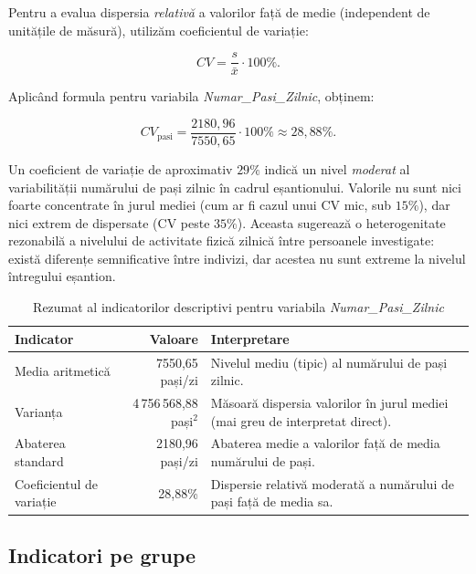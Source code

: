 \documentclass[12pt,a4paper]{report}
\begin{document}
Pentru a evalua dispersia \emph{relativă} a valorilor față de medie (independent de unitățile de măsură), utilizăm coeficientul de variație:

$$
CV = \frac{s}{\bar{x}} \cdot 100\%.
$$

Aplicând formula pentru variabila \textit{Numar\_Pasi\_Zilnic}, obținem:

$$
CV_{\text{pasi}} = \frac{2180{,}96}{7550{,}65} \cdot 100\% \approx 28{,}88\%.
$$

Un coeficient de variație de aproximativ \(29\%\) indică un nivel \textit{moderat} al variabilității numărului de pași zilnic în cadrul eșantionului. Valorile nu sunt nici foarte concentrate în jurul mediei (cum ar fi cazul unui CV mic, sub \(15\%\)), dar nici extrem de dispersate (CV peste \(35\%\)). Aceasta sugerează o heterogenitate rezonabilă a nivelului de activitate fizică zilnică între persoanele investigate: există diferențe semnificative între indivizi, dar acestea nu sunt extreme la nivelul întregului eșantion.

\begin{table}[h!]
    \centering
    \caption{Rezumat al indicatorilor descriptivi pentru variabila \textit{Numar\_Pasi\_Zilnic}}
    \label{tab:rezumat-pasi}
    \begin{tabular}{l r p{7cm}}
        \hline
        \textbf{Indicator} & \textbf{Valoare} & \textbf{Interpretare} \\
        \hline
        Media aritmetică & 7550{,}65 pași/zi &
        Nivelul mediu (tipic) al numărului de pași zilnic. \\[2pt]
        Varianța & 4\,756\,568{,}88 pași\(^2\) &
        Măsoară dispersia valorilor în jurul mediei (mai greu de interpretat direct). \\[2pt]
        Abaterea standard & 2180{,}96 pași/zi &
        Abaterea medie a valorilor față de media numărului de pași. \\[2pt]
        Coeficientul de variație & 28{,}88\% &
        Dispersie relativă moderată a numărului de pași față de media sa. \\
        \hline
    \end{tabular}
\end{table}


\subsection{Indicatori pe grupe}
\end{document}
